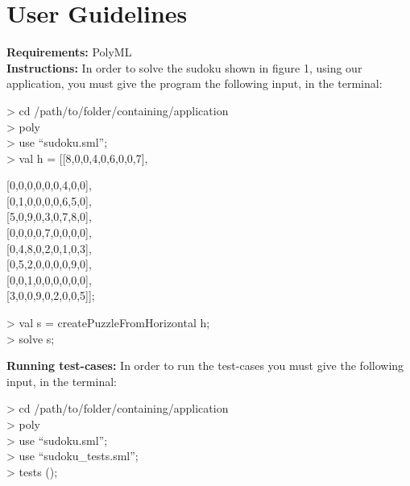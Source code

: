 \documentclass[12pt, a4paper]{article}
\begin{document}
  	\section{User Guidelines}
		\begin{adjustwidth}{3em}{0pt}
			\textbf{Requirements:} PolyML \\
			\textbf{Instructions:} 
			In order to solve the sudoku shown in figure 1, using our application, you must give the program the following input, in the terminal: \\
			\begin{ttfamily}
				> cd /path/to/folder/containing/application \\
				> poly \\
				> use “sudoku.sml”; \\
				> val h = {[}{[}8,0,0,4,0,6,0,0,7{]},
					\begin{adjustwidth}{5.5em}{0pt}
				           {[}0,0,0,0,0,0,4,0,0{]}, \\
					       {[}0,1,0,0,0,0,6,5,0{]}, \\
				           {[}5,0,9,0,3,0,7,8,0{]}, \\
				           {[}0,0,0,0,7,0,0,0,0{]}, \\
					       {[}0,4,8,0,2,0,1,0,3{]}, \\
				           {[}0,5,2,0,0,0,0,9,0{]}, \\
				           {[}0,0,1,0,0,0,0,0,0{]}, \\
				           {[}3,0,0,9,0,2,0,0,5{]}{]}; \\
				    \end{adjustwidth}
				> val s = createPuzzleFromHorizontal h; \\
				> solve s;\\
			\end{ttfamily}

			\textbf{Running test-cases:} In order to run the test-cases you must give the following input, in the terminal:\\
			\begin{ttfamily}
				> cd /path/to/folder/containing/application \\
				> poly \\
				> use “sudoku.sml”; \\
				> use “sudoku\_tests.sml”; \\
				> tests (); \\
			\end{ttfamily}
  		\end{adjustwidth}
\end{document}
